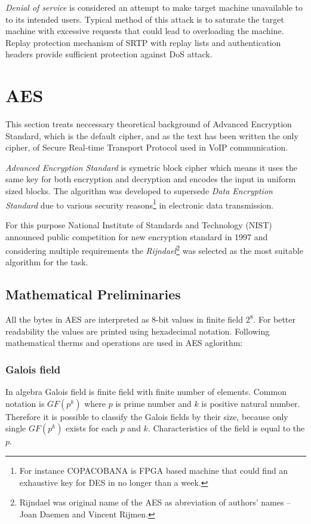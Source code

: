 \textit{Denial of service} is considered an attempt to make target machine 
unavailable to to its intended users. Typical method of this attack is to 
saturate the target machine with excessive requests that could lead to 
overloading the machine. Replay protection mechanism of SRTP with replay lists 
and authentication headers provide sufficient protection against DoS 
attack\cite{rfc3711, cisco:srtp}.

\section{AES}
This section treats neccessary theoretical background of Advanced Encryption 
Standard, which is the default cipher, and as the text has been written the only
cipher, of Secure Real-time Transport Protocol used in VoIP communication.

\textit{Advanced Encryption Standard} is symetric block cipher which means 
it uses the same key for both encryption and decryption and encodes the
input in uniform sized blocks. The algorithm was developed to supersede
\textit{Data Encryption Standard} due to various security reasons\footnote
{ For instance COPACOBANA is FPGA based machine that could find 
an exhaustive key for DES in no longer than a week\cite{copacobana}.} in 
electronic data transmission. 

For this purpose National Institute of Standards and Technology (NIST)
announced public competition for new encryption standard in 1997 and 
considering multiple requirements the \textit{Rijndael}\footnote{ Rijndael
was original name of the AES as abreviation of authors' names -- Joan 
Daemen and Vincent Rijmen.} was selected as the most suitable algorithm
for the task\cite{AES-FIPS}. 

\subsection{Mathematical Preliminaries}
All the bytes in AES are interpreted as 8-bit values in finite field $2^8$.
For better readability the values are printed using hexadecimal notation.
Following mathematical therms and operations are used in AES aglorithm:

\subsubsection*{Galois field}
In algebra Galois field is finite field with finite number of elements.
Common notation is $GF(p^k)$ where $p$ is prime number and $k$ is positive
natural number. Therefore it is possible to classify the Galois fields 
by their size, because only single $GF(p^k)$ exists for each $p$ and $k$.
Characteristics of the field is equal to the $p$.

